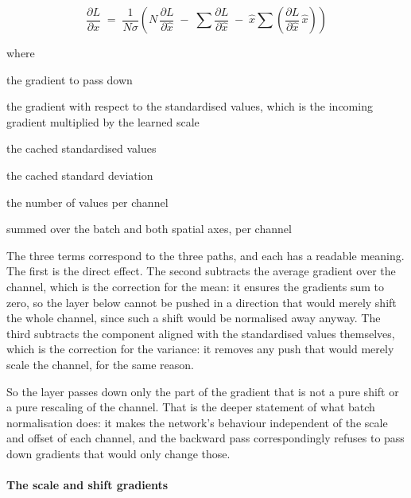 \begin{equation}
\frac{\partial L}{\partial x} \;=\; \frac{1}{N\sigma}\left( N \, \frac{\partial L}{\partial \hat{x}} \;-\; \sum \frac{\partial L}{\partial \hat{x}} \;-\; \hat{x} \sum \left( \frac{\partial L}{\partial \hat{x}} \, \hat{x} \right) \right)
\end{equation}

\noindent where
\begin{description}[leftmargin=2.4em,style=nextline,font=\normalfont\ttfamily]\setlength\itemsep{1pt}
  \item[{$\frac{\partial L}{\partial x}$}] \normalfont the gradient to pass down
  \item[{$\frac{\partial L}{\partial \hat{x}}$}] \normalfont the gradient with respect to the standardised values, which is the incoming gradient multiplied by the learned scale
  \item[{$\hat{x}$}] \normalfont the cached standardised values
  \item[{$\sigma$}] \normalfont the cached standard deviation
  \item[{$N$}] \normalfont the number of values per channel
  \item[{$\sum$}] \normalfont summed over the batch and both spatial axes, per channel
\end{description}
The three terms correspond to the three paths, and each has a readable meaning. The first is the direct effect. The second subtracts the average gradient over the channel, which is the correction for the mean: it ensures the gradients sum to zero, so the layer below cannot be pushed in a direction that would merely shift the whole channel, since such a shift would be normalised away anyway. The third subtracts the component aligned with the standardised values themselves, which is the correction for the variance: it removes any push that would merely scale the channel, for the same reason.

So the layer passes down only the part of the gradient that is not a pure shift or a pure rescaling of the channel. That is the deeper statement of what batch normalisation does: it makes the network's behaviour independent of the scale and offset of each channel, and the backward pass correspondingly refuses to pass down gradients that would only change those.


\paragraph{The scale and shift gradients}

